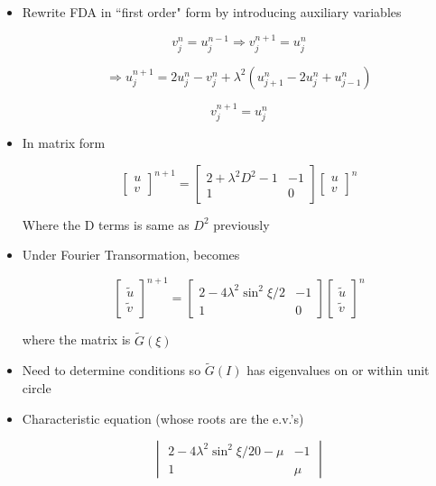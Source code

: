 \begin{itemize}
    \item Rewrite FDA in ``first order" form by introducing auxiliary variables

    \[ v_j^n = u_j^{n-1} \Rightarrow v_j^{n+1}=u_j^n\]

    \[ \Rightarrow u_j^{n+1} = 2 u_j^n - v_j^n + \lambda^2(u_{j+1}^n - 2u_j^n + u_{j-1}^n)\]

    \[ v_j^{n+1} = u_j^n\]

    \item In matrix form

    \[\begin{bmatrix}
        u \\
        v
    \end{bmatrix}^{n+1} = \begin{bmatrix}
        2+\lambda^2D^2-1 & -1 \\
        1 & 0
    \end{bmatrix}
    \begin{bmatrix}
        {u} \\
        {v}
    \end{bmatrix}^n \]

    Where the D terms is same as $D^2$ previously 
    
    \item Under Fourier Transormation, becomes

    \[\begin{bmatrix}
        \tilde{u} \\
        \tilde{v}
    \end{bmatrix}^{n+1} = \begin{bmatrix}
        2-4\lambda^2 \sin^2 \xi/2 & -1 \\
        1 & 0
    \end{bmatrix}
    \begin{bmatrix}
        \tilde{u} \\
        \tilde{v}
    \end{bmatrix}^n\]

    where the matrix is $\tilde{G}(\xi)$

    \item Need to determine conditions so $\tilde{G}(I)$ has eigenvalues on or within unit circle

    \item Characteristic equation (whose roots are the e.v.'s)

    \[ \begin{vmatrix}
    2-4\lambda^2\sin^2\xi/20-\mu & -1 \\
    1 & \mu
        

\end{vmatrix}\]
\end{itemize}
